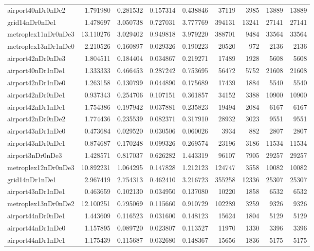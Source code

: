 \begin{longtable}{|l|r|r|r|r|r|r|r|r|}
airport40nDr0nDe2 & 1.791980 & 0.281532 & 0.157314 & 0.438846 & 37119 & 3985 & 13889 & 13889 \\
grid14nDr0nDe1 & 1.478697 & 3.050738 & 0.727031 & 3.777769 & 394131 & 13241 & 27141 & 27141 \\
metroplex11nDr0nDe3 & 13.110276 & 3.029402 & 0.949818 & 3.979220 & 388701 & 9484 & 33564 & 33564 \\
metroplex13nDr1nDe0 & 2.210526 & 0.160897 & 0.029326 & 0.190223 & 20520 & 972 & 2136 & 2136 \\
airport42nDr0nDe3 & 1.804511 & 0.184404 & 0.034867 & 0.219271 & 17489 & 1928 & 5608 & 5608 \\
airport40nDr1nDe1 & 1.333333 & 0.466453 & 0.287242 & 0.753695 & 56472 & 5752 & 21608 & 21608 \\
airport42nDr1nDe0 & 1.263158 & 0.130799 & 0.044890 & 0.175689 & 17439 & 1884 & 5540 & 5540 \\
airport42nDr0nDe1 & 0.937343 & 0.254706 & 0.107151 & 0.361857 & 34152 & 3388 & 10900 & 10900 \\
airport42nDr1nDe1 & 1.754386 & 0.197942 & 0.037881 & 0.235823 & 19494 & 2084 & 6167 & 6167 \\
airport42nDr0nDe2 & 1.774436 & 0.235539 & 0.082371 & 0.317910 & 28932 & 3023 & 9551 & 9551 \\
airport43nDr1nDe0 & 0.473684 & 0.029520 & 0.030506 & 0.060026 & 3934 & 882 & 2807 & 2807 \\
airport43nDr0nDe1 & 0.874687 & 0.170248 & 0.099326 & 0.269574 & 23196 & 3186 & 11534 & 11534 \\
airport3nDr0nDe3 & 1.428571 & 0.817037 & 0.626282 & 1.443319 & 96107 & 7905 & 29257 & 29257 \\
metroplex12nDr0nDe3 & 10.892231 & 1.064295 & 0.147828 & 1.212123 & 124747 & 3558 & 10082 & 10082 \\
grid14nDr1nDe1 & 2.967419 & 2.754313 & 0.462410 & 3.216723 & 355258 & 12336 & 25307 & 25307 \\
airport43nDr1nDe1 & 0.463659 & 0.102130 & 0.034950 & 0.137080 & 10220 & 1858 & 6532 & 6532 \\
metroplex13nDr0nDe2 & 12.100251 & 0.795069 & 0.115660 & 0.910729 & 102289 & 3259 & 9326 & 9326 \\
airport44nDr0nDe1 & 1.443609 & 0.116523 & 0.031600 & 0.148123 & 15624 & 1804 & 5129 & 5129 \\
airport44nDr1nDe0 & 1.157895 & 0.089720 & 0.023807 & 0.113527 & 11970 & 1330 & 3396 & 3396 \\
airport44nDr1nDe1 & 1.175439 & 0.115687 & 0.032680 & 0.148367 & 15656 & 1836 & 5175 & 5175 \\

\end{longtable}
